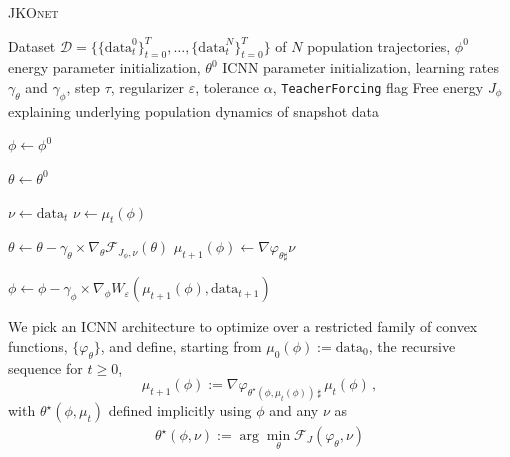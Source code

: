 \begin{algorithm}[t]
\caption{\textsc{JKOnet}}
\label{algo:jkonet}
\begin{algorithmic}

    Dataset $\mathcal{D}=\{\{\mathrm{data}_t^0 \}_{t=0}^T, \ldots, \{\mathrm{data}_t^N \}_{t=0}^T\}$ of $N$ population trajectories, $\phi^0$ energy parameter initialization, $\theta^0$ \acrshort{ICNN} parameter initialization, learning rates $\gamma_\theta$ and $\gamma_\phi$, step $\tau$, regularizer $\varepsilon$, tolerance $\alpha$, {\texttt{TeacherForcing}} flag
    Free energy $J_{\phi}$ explaining underlying population dynamics of snapshot data
   \smallskip
   
   \STATE $\phi\leftarrow \phi^0$

   \STATE $\theta\leftarrow \theta^0$

    \STATE $\nu \leftarrow \mathrm{data}_t$
   \ELSE
   \STATE $\nu \leftarrow \mu_t(\phi)$
   \ENDIF
    
   \STATE $\theta \leftarrow \theta - \gamma_\theta \times \nabla_\theta \mathcal{F}_{J_\phi,\nu}(\theta)$
   \ENDWHILE
   \STATE $\mu_{t+1}(\phi) \leftarrow \nabla \varphi_{\theta \sharp} \nu$

   \STATE $\phi \leftarrow \phi - \gamma_\phi \times \nabla_\phi W_\varepsilon(\mu_{t+1}(\phi), \mathrm{data}_{t+1})$
   \ENDFOR
   \ENDFOR
	
\end{algorithmic}
\end{algorithm}

We pick an \acrshort{ICNN} architecture to optimize over a restricted family of convex functions, $\{\varphi_{\theta}\}$, and define, starting from $\mu_0(\phi):=\mathrm{data}_0$, the recursive sequence for $t\geq 0$,
\begin{equation} \label{eq:next_pop}
\mu_{t+1}(\phi) := \nabla \varphi_{\theta^\star\!(\phi, \mu_t(\phi))\, \sharp}\, \mu_{t}(\phi)\,,
\end{equation}
with $\theta^\star(\phi, \mu_t)$ defined implicitly using $\phi$ and any $\nu$ as 
\begin{align} \label{eq:thetastar}
    \theta^\star(\phi, \nu):=\arg \min_{\theta} \mathcal{F}_J(\varphi_{\theta},\nu)
\end{align}

